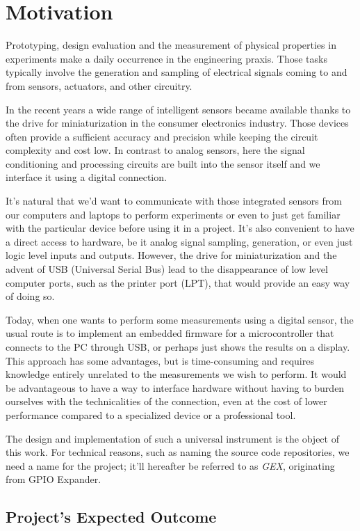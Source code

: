 \chapter{Motivation}

Prototyping, design evaluation and the measurement of physical properties in experiments make a daily occurrence in the engineering praxis. Those tasks typically involve the generation and sampling of electrical signals coming to and from sensors, actuators, and other circuitry. 

In the recent years a wide range of intelligent sensors became available thanks to the drive for miniaturization in the consumer electronics industry. Those devices often provide a sufficient accuracy and precision while keeping the circuit complexity and cost low. In contrast to analog sensors, here the signal conditioning and processing circuits are built into the sensor itself and we interface it using a digital connection.

It's natural that we'd want to communicate with those integrated sensors from our computers and laptops to perform experiments or even to just get familiar with the particular device before using it in a project. It's also convenient to have a direct access to hardware, be it analog signal sampling, generation, or even just logic level inputs and outputs. However, the drive for miniaturization and the advent of USB (Universal Serial Bus) lead to the disappearance of low level computer ports, such as the printer port (LPT), that would provide an easy way of doing so.

Today, when one wants to perform some measurements using a digital sensor, the usual route is to implement an embedded firmware for a microcontroller that connects to the PC through USB, or perhaps just shows the results on a display. This approach has some advantages, but is time-consuming and requires knowledge entirely unrelated to the measurements we wish to perform. It would be advantageous to have a way to interface hardware without having to burden ourselves with the technicalities of the connection, even at the cost of lower performance compared to a specialized device or a professional tool. 

The design and implementation of such a universal instrument is the object of this work. For technical reasons, such as naming the source code repositories, we need a name for the project; it'll hereafter be referred to as \textit{GEX}, originating from GPIO Expander.

\section{Project's Expected Outcome}

